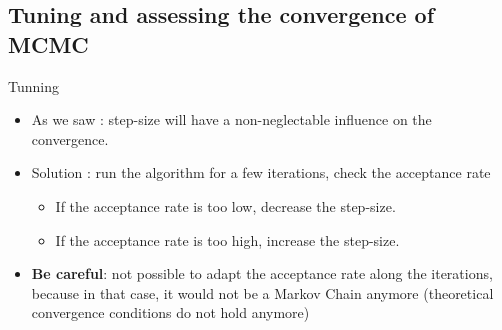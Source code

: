 \subsection{Tuning and assessing the convergence of MCMC}
\begin{frame}{Tunning}
 
\begin{itemize}
 \item As we saw : step-size will have a non-neglectable influence on the convergence. 
 \item Solution : run the algorithm for a few iterations, check the acceptance rate 
\begin{itemize}
  \item If the acceptance rate is too low, decrease the step-size. 
  \item If the acceptance rate is too high, increase the step-size. 
\end{itemize}
\item \color{dgreen} \textbf{Be careful}\color{black}: not possible to adapt the acceptance rate   along the iterations, because in that case, it would not be a Markov Chain anymore (theoretical convergence conditions do not hold anymore)
\end{itemize}
\end{frame}


